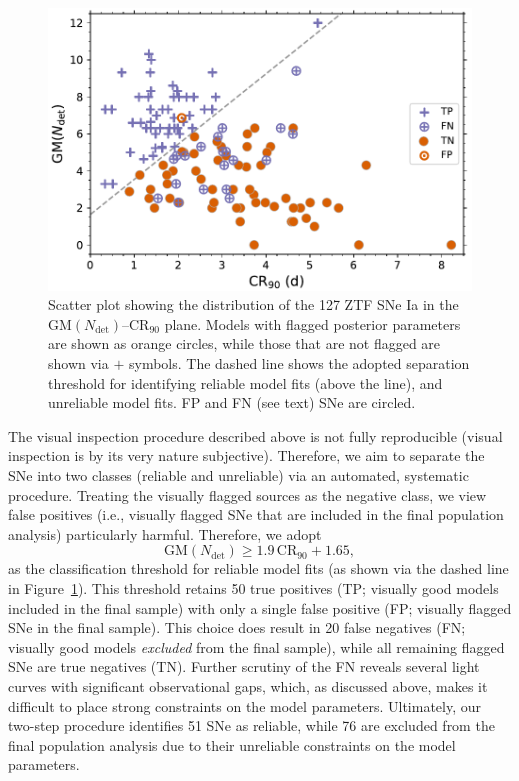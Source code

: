 \documentclass[twocolumn]{./aastex63}
\begin{document}
\begin{figure}
    \centering
    \includegraphics[width=5in]{./figures/final_sample.pdf}
    \caption{Scatter plot showing the distribution of the 127 ZTF SNe Ia in
    the $\mathrm{GM}(N_\mathrm{det})$--$\mathrm{CR}_{90}$ plane. Models with
    flagged posterior parameters are shown as orange circles, while those
    that are not flagged are shown via $+$ symbols. The dashed line shows the
    adopted separation threshold for identifying reliable model fits (above
    the line), and unreliable model fits. FP and FN (see text) SNe are
    circled. }
    \label{fig:flagged_sn}
\end{figure}

The visual inspection procedure described above is not fully reproducible
(visual inspection is by its very nature subjective). Therefore, we aim to
separate the SNe into two classes (reliable and unreliable) via an automated,
systematic procedure. Treating the visually flagged sources as the negative
class, we view false positives (i.e., visually flagged SNe that are included
in the final population analysis) particularly harmful. Therefore, we adopt
%
$$ \mathrm{GM}(N_\mathrm{det}) \ge 1.9\,\mathrm{CR}_{90} + 1.65,$$
%
as the classification threshold for reliable model fits (as shown via the
dashed line in Figure~\ref{fig:flagged_sn}). This threshold retains 50 true
positives (TP; visually good models included in the final sample) with only a
single false positive (FP; visually flagged SNe in the final sample). This
choice does result in 20 false negatives (FN; visually good models
\textit{excluded} from the final sample), while all remaining flagged SNe are
true negatives (TN). Further scrutiny of the FN reveals several light curves
with significant observational gaps, which, as discussed above, makes it
difficult to place strong constraints on the model parameters. Ultimately,
our two-step procedure identifies 51 SNe as reliable, while 76 are excluded
from the final population analysis due to their unreliable constraints on the
model parameters.
\end{document}
